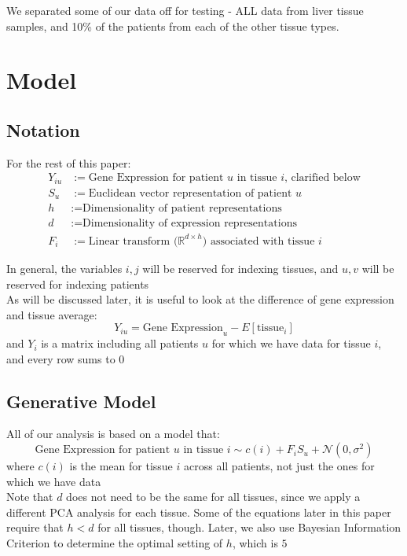 \documentclass{article}
\newcommand{\tx}[1]{\text{#1}}
\begin{document}
We separated some of our data off for testing - ALL data from liver tissue samples, and 10\% of the patients from each of the other tissue types.


\section{Model} %

\subsection{Notation} %

For the rest of this paper:
\begin{align*}
Y_{iu} &:= \tx{Gene Expression for patient $u$ in tissue $i$, clarified below} \\
S_u &:= \tx{Euclidean vector representation of patient $u$} \\
h &:= \tx{Dimensionality of patient representations} \\
d &:= \tx{Dimensionality of expression representations} \\
F_i &:= \tx{Linear transform ($\mathbb{R}^{d \times h}$) associated with tissue $i$}
\end{align*}

In general, the variables $i,j$ will be reserved for indexing tissues, and $u,v$ will be reserved for indexing patients \\

As will be discussed later, it is useful to look at the difference of gene expression and tissue average:
\[ Y_{iu} = \tx{Gene Expression}_u - E[\tx{tissue}_i] \]
and $Y_i$ is a matrix including all patients $u$ for which we have data for tissue $i$, and every row sums to $0$ \\

\subsection{Generative Model}

All of our analysis is based on a model that:
\[ \tx{Gene Expression for patient $u$ in tissue $i$} \sim c(i) + F_i S_u + \mathcal{N}(0,\sigma^2) \]
where $c(i)$ is the mean for tissue $i$ across all patients, not just the ones for which we have data \\

Note that $d$ does not need to be the same for all tissues, since we apply a different PCA analysis for each tissue. Some of the equations later in this paper require that $h < d$ for all tissues, though. Later, we also use Bayesian Information Criterion to determine the optimal setting of $h$, which is $5$ \\ 
\end{document}
